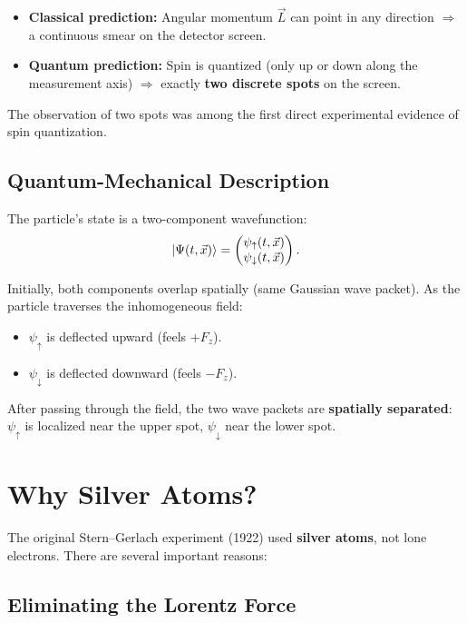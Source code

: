 \documentclass[11pt,a4paper]{article}
\theoremstyle{definition}
\theoremstyle{plain}
\theoremstyle{remark}
\begin{document}
\begin{itemize}
    \item \textbf{Classical prediction:} Angular momentum $\vec{L}$ can point in any direction $\Rightarrow$ a continuous smear on the detector screen.
    \item \textbf{Quantum prediction:} Spin is quantized (only up or down along the measurement axis) $\Rightarrow$ exactly \textbf{two discrete spots} on the screen.
\end{itemize}

The observation of two spots was among the first direct experimental evidence of spin quantization.

\subsection{Quantum-Mechanical Description}

The particle's state is a two-component wavefunction:
\[
    \ket{\Psi(t, \vec{x})} = \begin{pmatrix}\psi_\uparrow(t, \vec{x}) \\ \psi_\downarrow(t, \vec{x})\end{pmatrix}.
\]

Initially, both components overlap spatially (same Gaussian wave packet). As the particle traverses the inhomogeneous field:
\begin{itemize}
    \item $\psi_\uparrow$ is deflected upward (feels $+F_z$).
    \item $\psi_\downarrow$ is deflected downward (feels $-F_z$).
\end{itemize}

After passing through the field, the two wave packets are \textbf{spatially separated}: $\psi_\uparrow$ is localized near the upper spot, $\psi_\downarrow$ near the lower spot.

\section{Why Silver Atoms?}

The original Stern--Gerlach experiment (1922) used \textbf{silver atoms}, not lone electrons. There are several important reasons:

\subsection{Eliminating the Lorentz Force}
\end{document}
